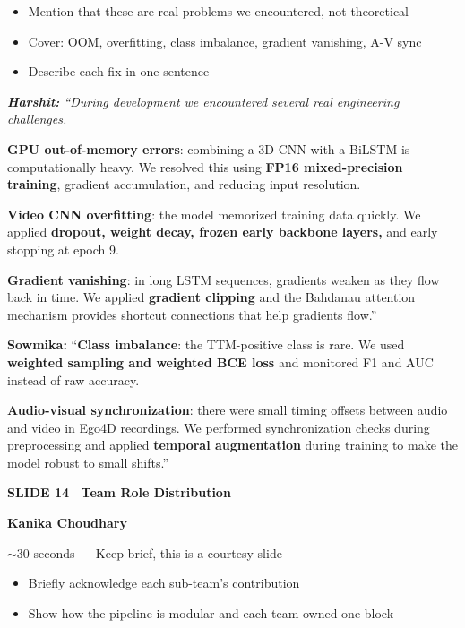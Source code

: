 \documentclass[11pt, a4paper]{article}
\newcommand{\slideheading}[3]{%
  \vspace{0.6cm}
  \begin{tcolorbox}[slidebox]
    \textbf{\color{NavyBlue}SLIDE #1 \textemdash\ #2}\\[2pt]
    \begin{tcolorbox}[presenterbox, title=Presenter(s)]
      \color{AccBlue}\bfseries #3
    \end{tcolorbox}
  \end{tcolorbox}
}
\newcommand{\timing}[1]{%
  \begin{tcolorbox}[timebox, title=Suggested Time]
    \color{AccOrange} #1
  \end{tcolorbox}
}
\newcommand{\keypoints}[1]{%
  \begin{tcolorbox}[keybox, title=Key Points to Cover]
    #1
  \end{tcolorbox}
}
\newcommand{\script}[1]{%
  \begin{mdframed}[
    backgroundcolor=white,
    linecolor=MidText!40,
    linewidth=0.5pt,
    leftmargin=0pt,
    rightmargin=0pt,
    innerleftmargin=10pt,
    innerrightmargin=8pt,
    innertopmargin=8pt,
    innerbottommargin=8pt,
    roundcorner=3pt
  ]
  \itshape\color{MidText}
  #1
  \end{mdframed}
}
\begin{document}
\keypoints{%
\begin{itemize}[leftmargin=*, itemsep=2pt]
  \item Mention that these are real problems we encountered, not theoretical
  \item Cover: OOM, overfitting, class imbalance, gradient vanishing, A-V sync
  \item Describe each fix in one sentence
\end{itemize}
}

\script{%
\textbf{Harshit:} ``During development we encountered several real engineering challenges.

\textbf{GPU out-of-memory errors}: combining a 3D CNN with a BiLSTM is computationally heavy. We resolved this using \textbf{FP16 mixed-precision training}, gradient accumulation, and reducing input resolution.

\textbf{Video CNN overfitting}: the model memorized training data quickly. We applied \textbf{dropout, weight decay, frozen early backbone layers,} and early stopping at epoch 9.

\textbf{Gradient vanishing}: in long LSTM sequences, gradients weaken as they flow back in time. We applied \textbf{gradient clipping} and the Bahdanau attention mechanism provides shortcut connections that help gradients flow.''

\textbf{Sowmika:} ``\textbf{Class imbalance}: the TTM-positive class is rare. We used \textbf{weighted sampling and weighted BCE loss} and monitored F1 and AUC instead of raw accuracy.

\textbf{Audio-visual synchronization}: there were small timing offsets between audio and video in Ego4D recordings. We performed synchronization checks during preprocessing and applied \textbf{temporal augmentation} during training to make the model robust to small shifts.''
}

\slideheading{14}{Team Role Distribution}{Kanika Choudhary}

\timing{$\sim$30 seconds --- Keep brief, this is a courtesy slide}

\keypoints{%
\begin{itemize}[leftmargin=*, itemsep=2pt]
  \item Briefly acknowledge each sub-team's contribution
  \item Show how the pipeline is modular and each team owned one block
\end{itemize}
}
\end{document}
